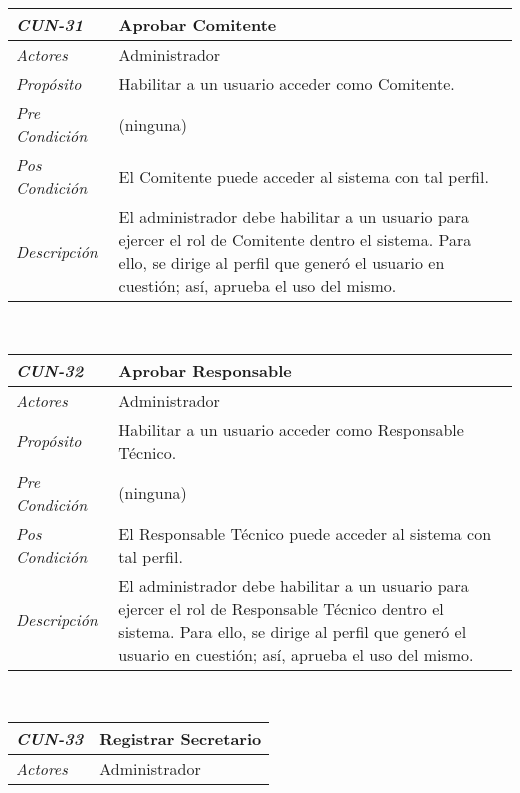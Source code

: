 \begin{center}
\hypertarget{CUN-31}{%
\begin{tabular}{ | p{3cm} | p{12.5cm} | }
	\hline
	\rowcolor{lightgray}
	\hfil \textbf{\textit{CUN-31}} &
	\hfil \textbf{Aprobar Comitente} \\
	\hline
	\raggedleft \textit{Actores} & Administrador \\
	\hline
	\raggedleft \textit{Prop\'osito} & Habilitar a
	un usuario acceder como Comitente. \\
	\hline
	\raggedleft \textit{Pre Condici\'on} & (ninguna) \\
	\hline
	\raggedleft \textit{Pos Condici\'on} & El Comitente
	puede acceder al sistema con tal perfil. \\
	\hline
	\raggedleft \textit{Descripci\'on} &
	El administrador debe habilitar a un usuario para
	ejercer el rol de Comitente dentro el sistema. Para
	ello, se dirige al perfil que gener\'o el usuario en
	cuesti\'on; as\'i, aprueba el uso del mismo. \\
	\hline
\end{tabular}} \\[1cm]
\hypertarget{CUN-32}{%
\begin{tabular}{ | p{3cm} | p{12.5cm} | }
	\hline
	\rowcolor{lightgray}
	\hfil \textbf{\textit{CUN-32}} &
	\hfil \textbf{Aprobar Responsable} \\
	\hline
	\raggedleft \textit{Actores} & Administrador \\
	\hline
	\raggedleft \textit{Prop\'osito} & Habilitar a
	un usuario acceder como Responsable T\'ecnico. \\
	\hline
	\raggedleft \textit{Pre Condici\'on} & (ninguna) \\
	\hline
	\raggedleft \textit{Pos Condici\'on} & El Responsable
	T\'ecnico puede acceder al sistema con tal perfil. \\
	\hline
	\raggedleft \textit{Descripci\'on} &
	El administrador debe habilitar a un usuario para
	ejercer el rol de Responsable T\'ecnico dentro el
	sistema. Para ello, se dirige al perfil que gener\'o
	el usuario en cuesti\'on; as\'i, aprueba el uso del
	mismo. \\
	\hline
\end{tabular}} \\[1cm]
\hypertarget{CUN-33}{%
\begin{tabular}{ | p{3cm} | p{12.5cm} | }
	\hline
	\rowcolor{lightgray}
	\hfil \textbf{\textit{CUN-33}} &
	\hfil \textbf{Registrar Secretario} \\
	\hline
	\raggedleft \textit{Actores} & Administrador \\

\end{tabular}}
\end{center}
